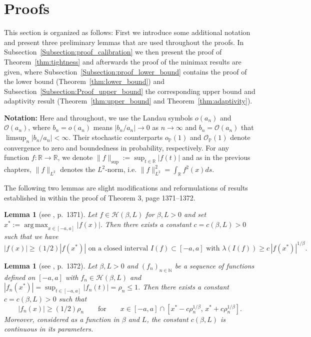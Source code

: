 \documentclass[10.5pt,letter]{article}
\numberwithin{equation}{section}
\newtheorem{lemma}[theorem]{Lemma}
\theoremstyle{definition}
\newcommand{\R}{\mathbb{R}}
\renewcommand{\P}{\mathbb{P}}
\newcommand{\1}{\mathbbm{1}}
\DeclareMathOperator*{\argmax}{arg\,max}
\begin{document}
\section{Proofs}\label{Section:proofs}

This section is organized as follows: First we introduce some additional notation and present three preliminary lemmas that are used throughout the proofs. In Subsection~\ref{Subsection:proof_calibration} we then present the proof of Theorem~\ref{thm:tightness} and afterwards the proof of the minimax results are given, where Subsection~\ref{Subsection:proof_lower_bound} contains the proof of the lower bound (Theorem~\ref{thm:lower_bound}) and Subsection~\ref{Subsection:Proof_upper_bound} the corresponding upper bound and adaptivity result (Theorem~\ref{thm:upper_bound} and Theorem~\ref{thm:adaptivity}).\smallskip


\textbf{Notation:} Here and throughout, we use the Landau symbols $o(a_n)$ and $\mathcal O(a_n)$, where $b_n=o(a_n)$ means $|b_n/a_n|\to 0$ as $n\to\infty$ and $b_n=\mathcal{O}(a_n)$ that $\limsup_n |b_n/a_n| <\infty$. Their stochastic counterparts $o_{\P}(1)$ and $\mathcal O_{\P}(1) $ denote convergence to zero and boundedness in probability, respectively. For any function $f:\R\rightarrow\R$, we denote $\|f\|_{\sup}:= \sup_{t\in\R}|f(t)|$ and as in the previous chapters, $\|f\|_{L^2}$ denotes the $L^2$-norm, i.e. $\|f\|_{L^2}^2= \int_\R f^2(x)ds$.  \smallskip

The following two lemmas are slight modifications and reformulations of results
established in \cite{Rohde_2008} within the proof of Theorem 3, page 1371--1372.

\begin{lemma}[see \cite{Rohde_2008}, p.~1371]\label{lem:rohde1}
Let $f \in \mathcal{H}(\beta,L)$ for $\beta,L>0$ and set $x^* := \argmax_{x\in[-a,a]} |f(x)|.$
Then there exists a constant $c=c(\beta,L)>0$ such that we have
\[ |f(x)| \ge (1/2)|f(x^*)| \text{ on a closed interval } I(f)\subset[-a,a] \text{ with } \lambda(I(f)) \ge c\,|f(x^*)|^{1/\beta}.\]
\end{lemma}



\begin{lemma}[see \cite{Rohde_2008}, p.~1372]\label{lem:rohde2}
Let $\beta,L>0$ and $(f_n)_{n\in\mathbb{N}}$ be a sequence of functions defined on $[-a,a]$ with $f_n\in\mathcal{H}(\beta,L)$ and
$|f_n(x^*)| = \sup_{t\in [-a,a]}|f_n(t)| = \rho_n \le 1$. Then there exists a constant $c=c(\beta,L)>0$ such that
\[ |f_n(x)| \ge (1/2)\rho_n \qquad \text{for} \qquad x\in [-a,a]\cap \left[x^*-c\rho_n^{1/\beta},\,x^*+c\rho_n^{1/\beta}\right]. \]
Moreover, considered as a function in $\beta$ and $L$, the constant
$c(\beta,L)$ is continuous in its parameters.
\end{lemma}
\end{document}
